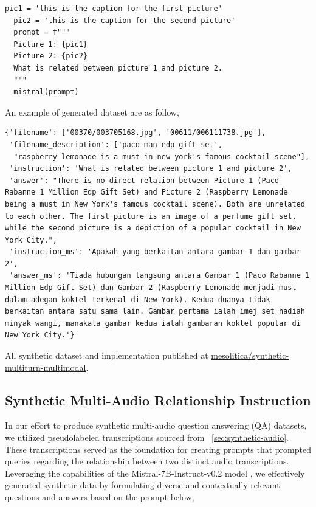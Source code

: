 \documentclass[preprint]{article}
\begin{document}
\begin{lstlisting}[breaklines=true]
  pic1 = 'this is the caption for the first picture'
  pic2 = 'this is the caption for the second picture'
  prompt = f"""
  Picture 1: {pic1} 
  Picture 2: {pic2}
  What is related between picture 1 and picture 2.
  """
  mistral(prompt)
\end{lstlisting}

An example of generated dataset are as follow,

\begin{lstlisting}[breaklines=true]
  {'filename': ['00370/003705168.jpg', '00611/006111738.jpg'],
 'filename_description': ['paco man edp gift set',
  "raspberry lemonade is a must in new york's famous cocktail scene"],
 'instruction': 'What is related between picture 1 and picture 2',
 'answer': "There is no direct relation between Picture 1 (Paco Rabanne 1 Million Edp Gift Set) and Picture 2 (Raspberry Lemonade being a must in New York's famous cocktail scene). Both are unrelated to each other. The first picture is an image of a perfume gift set, while the second picture is a depiction of a popular cocktail in New York City.",
 'instruction_ms': 'Apakah yang berkaitan antara gambar 1 dan gambar 2',
 'answer_ms': 'Tiada hubungan langsung antara Gambar 1 (Paco Rabanne 1 Million Edp Gift Set) dan Gambar 2 (Raspberry Lemonade menjadi must dalam adegan koktel terkenal di New York). Kedua-duanya tidak berkaitan antara satu sama lain. Gambar pertama ialah imej set hadiah minyak wangi, manakala gambar kedua ialah gambaran koktel popular di New York City.'}
\end{lstlisting}

All synthetic dataset and implementation published at \href{https://huggingface.co/datasets/mesolitica/synthetic-multiturn-multimodal#multi-images}{mesolitica/synthetic-multiturn-multimodal}.

\subsection{Synthetic Multi-Audio Relationship Instruction}

In our effort to produce synthetic multi-audio question answering (QA) datasets, we utilized pseudolabeled transcriptions sourced from ~\ref{sec:synthetic-audio}. These transcriptions served as the foundation for creating prompts that prompted queries regarding the relationship between two distinct audio transcriptions. Leveraging the capabilities of the Mistral-7B-Instruct-v0.2 model \cite{jiang2023mistral}, we effectively generated synthetic data by formulating diverse and contextually relevant questions and answers based on the prompt below,
\end{document}
